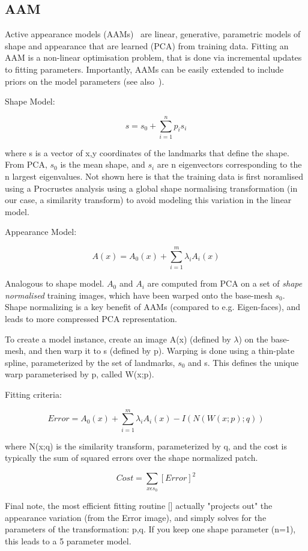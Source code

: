 \documentclass[10pt,twocolumn,letterpaper]{article}
\begin{document}
\subsection{AAM}
Active appearance models (AAMs)~\cite{CootesAAM2001} are linear, generative, parametric models of shape and appearance that are learned (PCA) from training data.  Fitting an AAM is a non-linear optimisation problem, that is done via incremental updates to fitting parameters.  Importantly, AAMs can be easily extended to include priors on the model parameters (see also~\cite{BakerAAM2004}).  

Shape Model:

\[s = s_0 + \sum_{i=1}^n p_i s_i\]

where s is a vector of x,y coordinates of the landmarks that define the shape.  From PCA, $s_0$ is the mean shape, and $s_i$ are n eigenvectors corresponding to the n largest eigenvalues.  Not shown here is that the training data is first noramlised using a Procrustes analysis using a global shape normalising transformation (in our case, a similarity transform) to avoid modeling this variation in the linear model.

Appearance Model:

\[A(x) = A_0(x) + \sum_{i=1}^m \lambda_i A_i(x)\]

Analogous to shape model. $A_0$ and $A_i$ are computed from PCA on a set of \emph{shape normalised} training images, which have been warped onto the base-mesh $s_0$.  Shape normalizing is a key benefit of AAMs (compared to e.g. Eigen-faces), and leads to more compressed PCA representation.

To create a model instance, create an image A(x) (defined by $\lambda$) on the base-mesh, and then warp it to s (defined by p).  Warping is done using a thin-plate spline, parameterized by the set of landmarks, $s_0$ and s.  This defines the unique warp parameterised by p, called W(x;p).

Fitting criteria:

\[Error = A_0(x) + \sum_{i=1}^m \lambda_i A_i(x) - I(N(W(x;p);q)) \]

where N(x;q) is the similarity transform, parameterized by q, and the cost is typically the sum of squared errors over the shape normalized patch.

\[Cost = \sum_{x \epsilon s_0} [Error]^2 \]

Final note, the most efficient fitting routine [] actually "projects out" the appearance variation (from the Error image), and simply solves for the parameters of the transformation: p,q.  If you keep one shape parameter (n=1), this leads to a 5 parameter model.
\end{document}
